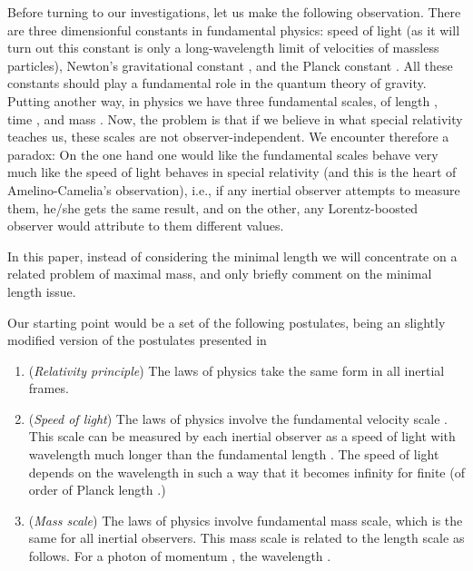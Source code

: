\documentclass [11pt] {article}
\begin{document}
Before turning to our investigations, let us make the following
observation. There are three dimensionful constants in fundamental
physics: speed of light \coordHE{} (as it will turn out this constant is
only a long-wavelength limit of velocities of massless particles),
Newton's gravitational constant \coordHE{}, and the Planck constant
\myHighlight{$\hbar$}\coordHE{}. All these constants should play a fundamental role in the
quantum theory of gravity. Putting another way, in
 physics we have three fundamental scales, of length
 \coordHE{},
 time \coordHE{}, and mass
 \coordHE{}.  Now, the problem
 is that if we believe in what special relativity teaches us,
 these scales are not observer-independent. We encounter therefore a paradox:
 On the one
 hand one would like the fundamental scales
  behave very much like the speed of light behaves in
 special relativity (and this is the heart of Amelino-Camelia's observation),
  i.e., if any inertial observer attempts to
 measure them, he/she gets the same result, and on the other, any
 Lorentz-boosted observer
 would attribute to them different values. 



In this paper, instead of considering the minimal length we will 
concentrate on a related problem of 
 maximal mass, 
and only briefly comment on the minimal length issue. 



 

 Our starting point would be  a set of the following postulates, being
 an slightly modified version of the postulates presented in \cite{gac1}



 \begin{enumerate}



 \item ({\em Relativity principle}) The laws
 of physics take the same form in all inertial frames.
\item ({\em Speed of light}) The laws of physics
involve the fundamental velocity scale \coordHE{}. This scale can be measured by
each inertial observer as a speed of light with wavelength much longer than 
the fundamental length \coordHE{}. The speed of light depends on 
the wavelength \myHighlight{$\lambda$}\coordHE{} in such a way that it becomes infinity for finite 
\myHighlight{$\lambda$}\coordHE{} (of order of Planck length \coordHE{}.) 
\item ({\em Mass scale}) The laws of physics
involve fundamental mass  scale, \coordHE{}  which is the same
for all inertial observers. This mass scale is related to the
length scale as follows. For a photon of momentum \coordHE{},
the wavelength \coordHE{}.
 \end{enumerate}
\end{document}
